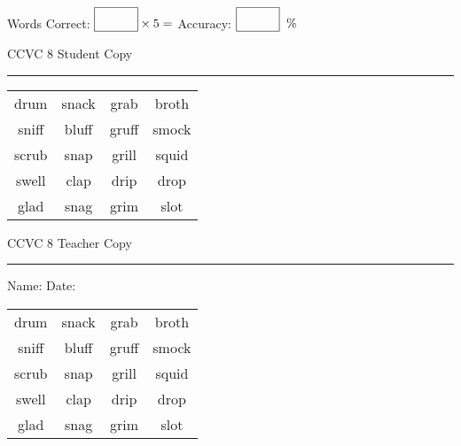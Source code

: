\documentclass{memoir}
\begin{document}
\normalsize

Words Correct: $\fbox{\phantom{\huge 100}} \times 5 = $ Accuracy: $\fbox{\phantom{\huge 100}}\;\; \%$ 

\vfill

\newpage


\footnotesize \noindent
CCVC 8 \hfill Student Copy
\smallskip
\hrule

\Large

\setlength{\tabcolsep}{14pt}
\def\arraystretch{3}

{\selectfont


\begin{vplace}[0.5]
\begin{center}
\begin{tabular}{cccc}
drum & snack & grab                    & broth    \\
sniff & bluff & gruff & smock \\
scrub & snap & grill            & squid \\
swell & clap             & drip & drop \\
glad & snag & grim       & slot \\
\end{tabular}
\end{center}
\end{vplace}

}

\newpage

\footnotesize \noindent
CCVC 8 \hfill Teacher Copy
\smallskip
\hrule

\normalsize

\vfill

\noindent
Name: \underline{\hspace{1.75in}} \hfill Date: \underline{\hspace{1in}}

\Large

{\selectfont


\begin{vplace}[0.5]
\begin{center}
\begin{tabular}{cccc}
drum & snack & grab                    & broth    \\
sniff & bluff & gruff & smock \\
scrub & snap & grill            & squid \\
swell & clap             & drip & drop \\
glad & snag & grim       & slot \\
\end{tabular}
\end{center}
\end{vplace}



}
\end{document}
